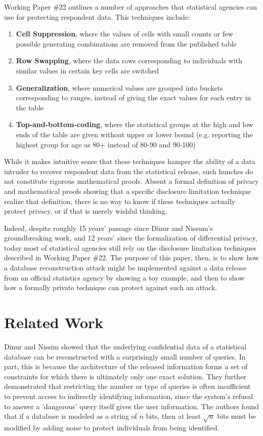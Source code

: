 \documentclass[runningheads]{llncs}
\begin{document}
Working Paper \#22 outlines a number of approaches that statistical
agencies can use for protecting respondent data. This techniques include:
\begin{enumerate}
  \item \textbf{Cell Suppression}, where the values of cells with small counts or few possible
        generating combinations are removed from the published table
  \item \textbf{Row Swapping}, where the data rows corresponding to individuals
        with similar values in certain key cells are switched
  \item \textbf{Generalization}, where numerical values are grouped into
        buckets corresponding to ranges, instead of giving the exact
        values for each entry in the table
  \item \textbf{Top-and-bottom-coding}, where the statistical groups at the high and low ends
        of the table are given without upper or lower bound (e.g.
        reporting the highest group for age as 80+ instead of
        80-90 and 90-100)
\end{enumerate}

While it makes intuitive sense that these techniques hamper the
ability of a data intruder to recover respondent data from the
statistical release, such hunches do not constitute rigorous
mathematical proofs. Absent a formal definition of privacy and
mathematical proofs showing that a specific disclosure limitation
technique realize that definition, there is no way to know if these
techniques actually protect privacy, or if that is merely wishful thinking.

Indeed, despite roughly 15 years' passage since Dinur and Nissum's
groundbreaking work\cite{noise}, and 12 years' since the formalization
of differential privacy\cite{Dwork:2006:CNS:2180286.2180305}, today most of
statistical agencies still rely on the disclosure
limitation techniques described in Working Paper \#22. The purpose of
this paper, then, is to show how a database reconstruction attack
might be implemented against a data release from an official
statistics agency by showing a toy example, and then to show how a
formally private  technique can protect against such an attack.

\section{Related Work}

Dinur and Nissim\cite{noise} showed that the underlying
confidential data of a statistical database can be reconstructed with
a surprisingly small number of queries. In part, this is because the
architecture of the released information forms a set of constraints
for which there is ultimately only one exact solution. They further
demonstrated that restricting the number or type of queries is often
insufficient to prevent access to indirectly identifying information,
since the system's refusal to answer a 'dangerous' query itself gives
the user information. The authors found that if a database is modeled
as a string of $n$ bits, then at least $\sqrt{n}$ bits must be
modified by adding noise to protect individuals from being identified. 
\end{document}
